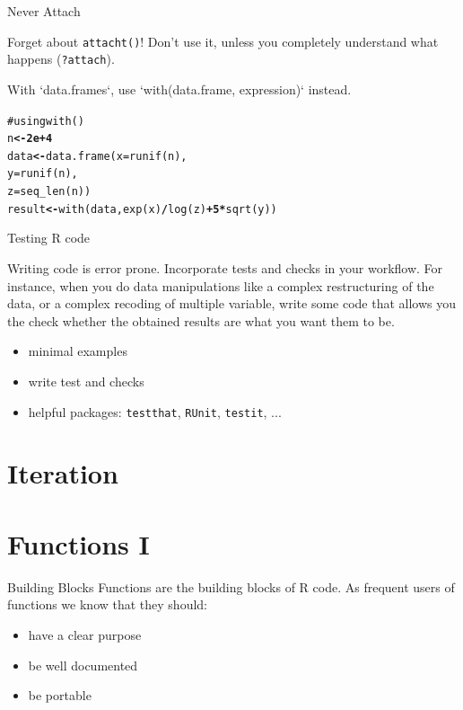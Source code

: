 \documentclass{beamer}\usepackage[]{graphicx}\usepackage[]{color}
\makeatletter
\newcommand{\hlnum}[1]{\textcolor[rgb]{0.502,0,0.502}{\textbf{#1}}}%
\newcommand{\hlcom}[1]{\textcolor[rgb]{1,0.502,0}{#1}}%
\newcommand{\hlopt}[1]{\textcolor[rgb]{1,0,0.502}{\textbf{#1}}}%
\newcommand{\hlstd}[1]{\textcolor[rgb]{0,0,0}{#1}}%
\newcommand{\hlkwb}[1]{\textcolor[rgb]{0.502,0.502,0.753}{\textbf{#1}}}%
\newcommand{\hlkwc}[1]{\textcolor[rgb]{0,0.502,0.753}{#1}}%
\newcommand{\hlkwd}[1]{\textcolor[rgb]{0,0.267,0.4}{#1}}%
\newenvironment{kframe}{%
 \def\at@end@of@kframe{}%
 \ifinner\ifhmode%
  \def\at@end@of@kframe{\end{minipage}}%
  \begin{minipage}{\columnwidth}%
 \fi\fi%
 \def\FrameCommand##1{\hskip\@totalleftmargin \hskip-\fboxsep
 \colorbox{shadecolor}{##1}\hskip-\fboxsep
     \hskip-\linewidth \hskip-\@totalleftmargin \hskip\columnwidth}%
 \MakeFramed {\advance\hsize-\width
   \@totalleftmargin\z@ \linewidth\hsize
   \@setminipage}}%
 {\par\unskip\endMakeFramed%
 \at@end@of@kframe}
\newenvironment{knitrout}{}{} %
\makeatother
\begin{document}
\begin{frame}[fragile]{Never Attach}

Forget about \texttt{attacht()}! Don't use it, unless you completely understand what happens (\texttt{?attach}).

With `data.frames`, use `with(data.frame, expression)` instead.

\begin{knitrout}
\color{fgcolor}\begin{kframe}
\begin{alltt}
\hlcom{# using with()}
\hlstd{n} \hlkwb{<-} \hlnum{2e+4}
\hlstd{data} \hlkwb{<-} \hlkwd{data.frame}\hlstd{(}\hlkwc{x} \hlstd{=} \hlkwd{runif}\hlstd{(n),}
                   \hlkwc{y} \hlstd{=} \hlkwd{runif}\hlstd{(n),}
                   \hlkwc{z} \hlstd{=} \hlkwd{seq_len}\hlstd{(n))}
\hlstd{result} \hlkwb{<-} \hlkwd{with}\hlstd{(data,} \hlkwd{exp}\hlstd{(x)} \hlopt{/} \hlkwd{log}\hlstd{(z)} \hlopt{+} \hlnum{5} \hlopt{*} \hlkwd{sqrt}\hlstd{(y))}
\end{alltt}
\end{kframe}
\end{knitrout}

\end{frame}



\begin{frame}[fragile]{Testing R code}

Writing code is error prone. Incorporate tests and checks in your workflow. For instance, when you do data manipulations like a complex restructuring of the data, or a complex recoding of multiple variable, write some code that allows you the check whether the obtained results are what you want them to be.

\begin{itemize}
  \item minimal examples
  \item write test and checks
  \item helpful packages: \texttt{testthat}, \texttt{RUnit}, \texttt{testit}, ...
\end{itemize}
\end{frame}



\section{Iteration}

\section{Functions I}
\begin{frame}{Building Blocks}
Functions are the building blocks of R code. As frequent users of functions we know that they should:
\begin{itemize}
  \item have a clear purpose
  \item be well documented
  \item be portable
\end{itemize}
\end{frame}
\end{document}
